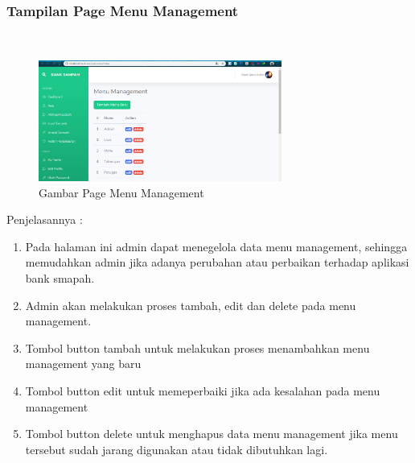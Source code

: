 \subsubsection{Tampilan Page Menu Management}
\hfill\\
	\begin{figure}[H]
		\includegraphics[width=8cm]{figures/analisis/25.png}
		\centering
		\caption{Gambar Page Menu Management}
	\end{figure}
Penjelasannya :
\begin{enumerate}
\item Pada halaman ini admin dapat menegelola data menu management, sehingga memudahkan admin jika adanya perubahan atau perbaikan terhadap aplikasi bank smapah.
\item Admin akan melakukan proses tambah, edit dan delete pada menu management.
\item Tombol button tambah untuk melakukan proses menambahkan menu management yang baru
\item Tombol button edit untuk memeperbaiki jika ada kesalahan pada menu management
\item Tombol button delete untuk menghapus data menu management jika menu tersebut sudah jarang digunakan atau tidak dibutuhkan lagi.

\end{enumerate}
	
